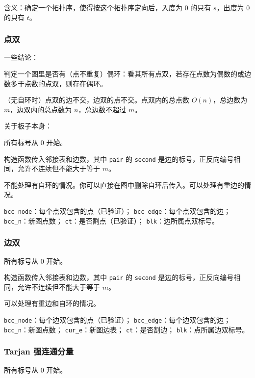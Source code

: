 \documentclass[12pt]{ctexart}
\begin{document}
含义：确定一个拓扑序，使得按这个拓扑序定向后，入度为 $0$ 的只有 $s$，出度为 $0$ 的只有 $t$。



\subsubsection{点双}

一些结论：

判定一个图里是否有（点不重复）偶环：看其所有点双，若存在点数为偶数的或边数多于点数的点双，则存在偶环。

（无自环时）点双的边不交，边双的点不交。点双内的总点数 $O(n)$，总边数为 $m$，边双内的总点数为 $n$，总边数不超过 $m$。

关于板子本身：

所有标号从 $0$ 开始。

构造函数传入邻接表和边数，其中 \verb|pair| 的 \verb|second| 是边的标号，正反向编号相同，允许不连续但不能大于等于 $m$。

不能处理有自环的情况。你可以直接在图中删除自环后传入。可以处理有重边的情况。

\verb|bcc_node|：每个点双包含的点（已验证）；
\verb|bcc_edge|：每个点双包含的边；
\verb|bcc_n|：新图点数；
\verb|ct|：是否割点（已验证）；
\verb|blk|：边所属点双标号。



\subsubsection{边双}

所有标号从 $0$ 开始。

构造函数传入邻接表和边数，其中 \verb|pair| 的 \verb|second| 是边的标号，正反向编号相同，允许不连续但不能大于等于 $m$。

可以处理有重边和自环的情况。

\verb|bcc_node|：每个边双包含的点（已验证）；
\verb|bcc_edge|：每个边双包含的边；
\verb|bcc_n|：新图点数；
\verb|cur_e|：新图边表；
\verb|ct|：是否割边；
\verb|blk|：点所属边双标号。



\subsubsection{Tarjan 强连通分量}


所有标号从 $0$ 开始。
\end{document}

